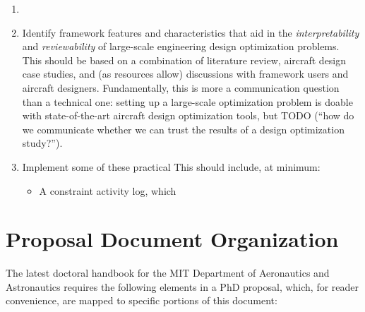 \documentclass[12pt,vi,oneside]{report}
\begin{document}
\begin{enumerate}
\begin{enumerate}
        \end{enumerate}
        \item
        \item Identify framework features and characteristics that aid in the \textit{interpretability} and \textit{reviewability} of large-scale engineering design optimization problems. This should be based on a combination of literature review, aircraft design case studies, and (as resources allow) discussions with framework users and aircraft designers. Fundamentally, this is more a communication question than a technical one: setting up a large-scale optimization problem is doable with state-of-the-art aircraft design optimization tools, but TODO (``how do we communicate whether we can trust the results of a design optimization study?'').
        \item Implement some of these practical This should include, at minimum:
        \begin{itemize}
            \item A constraint activity log, which
        \end{itemize}
    \end{enumerate}



    \section{Proposal Document Organization}

    The latest doctoral handbook for the MIT Department of Aeronautics and Astronautics \cite{mit_aa_doctoral_handbook} requires the following elements in a PhD proposal, which, for reader convenience, are mapped to specific portions of this document:
\end{document}
